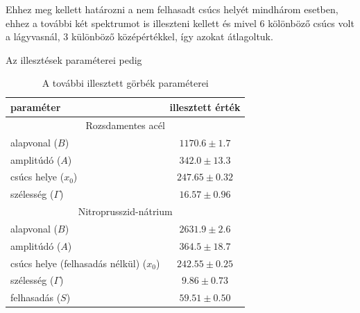 \documentclass[a4paper,12pt]{article}
\begin{document}
\par Ehhez meg kellett határozni a nem felhasadt csúcs helyét mindhárom esetben, ehhez a további két spektrumot is illeszteni kellett és mivel 6 kölönböző csúcs volt a lágyvasnál, 3 különböző középértékkel, így azokat átlagoltuk.

\par Az illesztések paraméterei pedig

\begin{table}[!htb]
	\begin{center}
	\begin{tabular}{|l|c|}
		\hline
		\textbf{paraméter} & \textbf{illesztett érték} \\
		\hline

		\hline
		\multicolumn{2}{c}{Rozsdamentes acél} \\
		\hline
		alapvonal ($B$) & $1170.6 \pm 1.7 $\\
		\hline
		amplitúdó ($A$) & $342.0 \pm 13.3 $\\
		\hline
		csúcs helye ($x_0$) & $247.65 \pm 0.32$\\
		\hline
		szélesség ($\Gamma$) & $16.57 \pm 0.96$\\
		\hline

		\hline
		\multicolumn{2}{c}{Nitroprusszid-nátrium} \\
		\hline
		alapvonal ($B$) & $2631.9 \pm 2.6 $\\
		\hline
		amplitúdó ($A$) & $364.5 \pm 18.7 $\\
		\hline
		csúcs helye (felhasadás nélkül) ($x_0$) & $242.55 \pm 0.25$\\
		\hline
		szélesség ($\Gamma$) & $9.86 \pm 0.73$\\
		\hline
		felhasadás ($S$) & $59.51 \pm 0.50$ \\
		\hline

	\end{tabular}
	\end{center}
	\caption{A további illesztett görbék paraméterei}
	\label{tab:params2}
\end{table}
\end{document}
